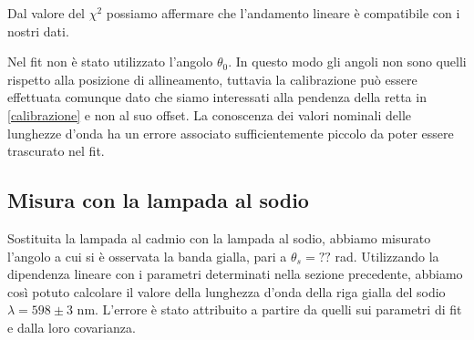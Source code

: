 Dal valore del $\chi^{2}$ possiamo affermare che l'andamento lineare è compatibile con i nostri dati.


Nel fit non è stato utilizzato l'angolo $\theta_{0}$. In questo modo gli angoli non sono quelli rispetto alla posizione di allineamento, tuttavia la calibrazione può essere effettuata comunque dato che siamo interessati alla pendenza della retta in \ref{calibrazione} e non al suo offset.
La conoscenza dei valori nominali delle lunghezze d'onda ha un errore associato sufficientemente piccolo da poter essere trascurato nel fit.


\subsection{Misura con la lampada al sodio}

Sostituita la lampada al cadmio con la lampada al sodio, abbiamo misurato l'angolo a cui si è osservata la banda gialla, pari a $\theta_{s} = ??$ rad. Utilizzando la dipendenza lineare con i parametri determinati nella sezione precedente, abbiamo così potuto calcolare il valore della lunghezza d'onda della riga gialla del sodio $\lambda = 598 \pm 3$ nm. L'errore è stato attribuito a partire da quelli sui parametri di fit e dalla loro covarianza.
